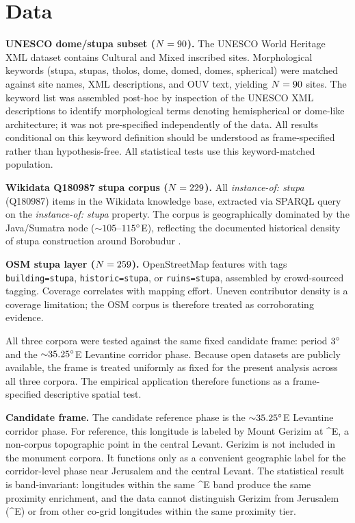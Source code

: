 \documentclass[12pt,a4paper]{article}
\newcommand{\degr}{\ifmmode^\circ\else\textdegree{}\fi}
\begin{document}
\section{Data}
\label{sec:data}

\textbf{UNESCO dome/stupa subset ($N = 90{}$).}
The UNESCO World Heritage XML dataset \citep{unescowhc2024xml} contains
\NclusterTotal{} Cultural and Mixed inscribed sites. Morphological
keywords (stupa, stupas, tholos, dome, domed, domes, spherical) were
matched against site names, XML descriptions, and OUV text, yielding
$N = 90{}$ sites. The keyword list was assembled
post-hoc by inspection of the UNESCO XML descriptions to identify
morphological terms denoting hemispherical or dome-like architecture;
it was not pre-specified independently of the data. All results conditional on this
keyword definition should be understood as frame-specified rather than
hypothesis-free. All statistical tests use this keyword-matched
population.

\textbf{Wikidata Q180987 stupa corpus ($N = 229{}$).}
All \textit{instance-of: stupa} (Q180987) items in the Wikidata
knowledge base, extracted via SPARQL query on the
\textit{instance-of: stupa} property. The corpus is
geographically dominated by the Java/Sumatra node
(${\sim}105$--$115\degr$E), reflecting the documented historical density
of stupa construction around Borobudur \citep{miksic1990borobudur}.

\textbf{OSM stupa layer ($N = 259{}$).}
OpenStreetMap features with tags \texttt{building=stupa},
\texttt{historic=stupa}, or \texttt{ruins=stupa}, assembled by
crowd-sourced tagging. Coverage correlates with mapping effort.
Uneven contributor density is a coverage limitation; the OSM corpus is
therefore treated as corroborating evidence.

All three corpora were tested against the same fixed candidate
frame: period $3\degr$ and the ${\sim}35.25\degr$E Levantine corridor
phase. Because open datasets are publicly available, the frame is
treated uniformly as fixed for the present analysis across all three
corpora. The empirical application therefore functions as a
frame-specified descriptive spatial test.

\textbf{Candidate frame.}
The candidate reference phase is the ${\sim}35.25\degr$E Levantine corridor
phase. For reference, this longitude is labeled by Mount Gerizim at
\GerizimLon\degr{}E, a non-corpus topographic point in the central
Levant. Gerizim is not included in the monument corpora. It functions
only as a convenient geographic label for the corridor-level phase near
Jerusalem and the central Levant. The statistical result is
band-invariant: longitudes within the same \xbandLabel\degr{}E band
produce the same proximity enrichment, and the data cannot distinguish
Gerizim from Jerusalem (\JerusalemLon\degr{}E) or from other co-grid
longitudes within the same proximity tier.
\end{document}
